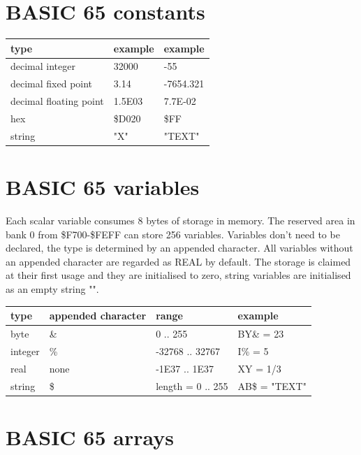 \newpage
\section{BASIC 65 constants}

{\ttfamily
\setlength{\tabcolsep}{1mm}
\begin{tabular}{|l|l|l|}
\hline
 type                   & example & example \\
\hline
decimal integer         &  32000  & -55       \\
decimal fixed point     &  3.14   & -7654.321 \\
decimal floating point  &  1.5E03 & 7.7E-02   \\
hex                     &  \$D020 & \$FF      \\
string                  & "X"     & "TEXT"    \\
\hline
\end{tabular}
}

\section{BASIC 65 variables}

Each scalar variable consumes 8 bytes of storage in memory.
The reserved area in bank 0 from \$F700-\$FEFF can store 256 variables.
Variables don't need to be declared, the type is determined by an appended
character. All variables without an appended character are regarded as REAL by default.
The storage is claimed at their first usage and they are initialised to zero,
string variables are initialised as an empty string "".

{\ttfamily
\setlength{\tabcolsep}{1mm}
\begin{tabular}{|l|l|l|l|}
\hline
 type                   & appended character & range    & example  \\
\hline
byte                    &    \&    & 0 .. 255        & BY\& = 23 \\
integer                 &    \%    & -32768 .. 32767 & I\% = 5    \\
real                    &   none   & -1E37 .. 1E37   & XY = 1/3   \\
string                  &    \$    & length = 0 .. 255 & AB\$ = "TEXT" \\
\hline
\end{tabular}
}

\section{BASIC 65 arrays}


